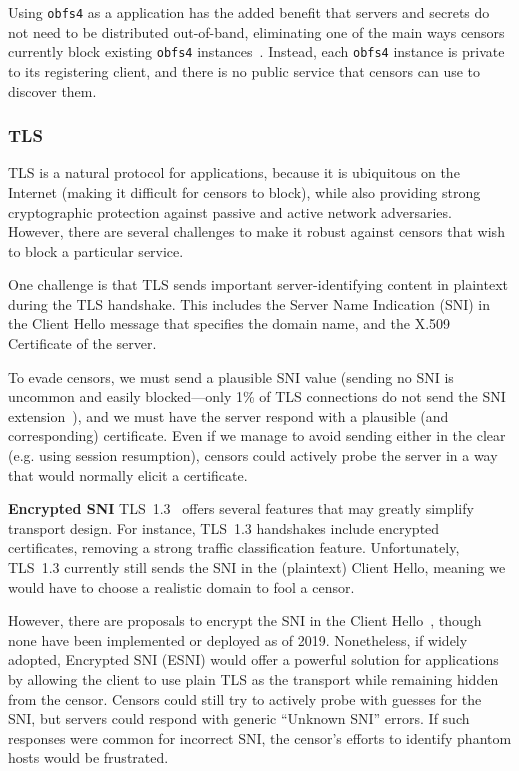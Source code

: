 \documentclass[sigconf]{acmart}
\renewcommand{\paragraph}[1]{\smallskip\noindent\textbf{#1\quad}}
\begin{document}
Using \texttt{obfs4} as a \scheme application has the added benefit that servers
and secrets do not need to be distributed out-of-band, eliminating one of the
main ways censors currently block existing \texttt{obfs4}
instances~\cite{tor-bridge-blocking-blog}. Instead, each \scheme \texttt{obfs4}
instance is private to its registering client, and there is no public service
that censors can use to discover them.



\subsubsection{TLS}

TLS is a natural protocol for \scheme applications, because it is ubiquitous on
the Internet (making it difficult for censors to block), while also providing
strong cryptographic protection against passive and active network adversaries.
However, there are several challenges to make it robust against censors that
wish to block a particular service.

One challenge is that TLS sends important server-identifying content in plaintext
during the TLS handshake. This includes the Server Name Indication (SNI) in the
Client Hello message that specifies the domain name, and the
X.509 Certificate of the server.

To evade censors, we must send a plausible SNI value (sending no SNI is
uncommon and easily blocked---only 1\% of TLS connections
do not send the SNI extension~\cite{tls-fingerprint}), and we must have the server respond with
a plausible (and corresponding) certificate. Even if we manage to avoid sending
either in the clear (e.g. using session resumption), censors could actively probe
the server in a way that would normally elicit a certificate.


\paragraph{Encrypted SNI}\label{esni}
TLS~1.3~\cite{tls13} offers several features that may greatly simplify 
\scheme transport design. For instance, TLS~1.3 handshakes include encrypted
certificates, removing a strong traffic classification feature.
Unfortunately, TLS~1.3 currently still sends the SNI in the (plaintext) Client
Hello, meaning we would have to choose a realistic domain to fool a censor.

However, there are proposals to encrypt the SNI in the Client Hello~\cite{ietf-tls-esni-02},
though none have been implemented or deployed as of 2019. Nonetheless,
if widely adopted, Encrypted SNI (ESNI) would offer a powerful solution for
\scheme applications by allowing the client to use plain TLS as the transport
while remaining hidden from the censor.
Censors could still try to actively probe with guesses for the SNI,
but servers could respond with generic ``Unknown SNI'' errors. If such responses
were common for incorrect SNI, the censor's efforts to identify phantom hosts
would be frustrated.
\end{document}
